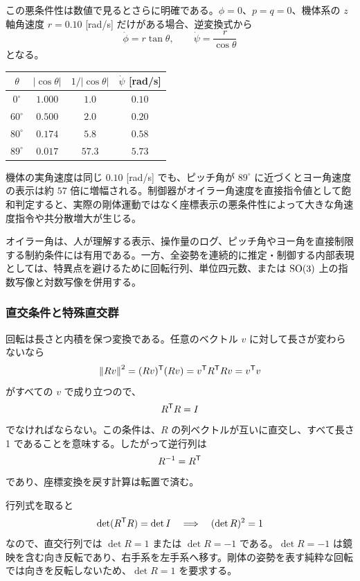 この悪条件性は数値で見るとさらに明確である。$\phi=0$、$p=q=0$、機体系の $z$ 軸角速度 $r=0.10$ [rad/s] だけがある場合、逆変換式から
\begin{equation}
  \dot{\phi}=r\tan\theta,\qquad
  \dot{\psi}=\frac{r}{\cos\theta}
\end{equation}
となる。
\begin{center}
\begin{tabular}{c|c|c|c}
$\theta$ & $|\cos\theta|$ & $1/|\cos\theta|$ & $\dot{\psi}$ [rad/s]\\
\hline
$0^\circ$ & $1.000$ & $1.0$ & $0.10$\\
$60^\circ$ & $0.500$ & $2.0$ & $0.20$\\
$80^\circ$ & $0.174$ & $5.8$ & $0.58$\\
$89^\circ$ & $0.017$ & $57.3$ & $5.73$
\end{tabular}
\end{center}
機体の実角速度は同じ $0.10$ [rad/s] でも、ピッチ角が $89^\circ$ に近づくとヨー角速度の表示は約 $57$ 倍に増幅される。制御器がオイラー角速度を直接指令値として飽和判定すると、実際の剛体運動ではなく座標表示の悪条件性によって大きな角速度指令や共分散増大が生じる。

オイラー角は、人が理解する表示、操作量のログ、ピッチ角やヨー角を直接制限する制約条件には有用である。一方、全姿勢を連続的に推定・制御する内部表現としては、特異点を避けるために回転行列、単位四元数、または $\operatorname{SO}(3)$ 上の指数写像と対数写像を併用する。

\subsubsection{直交条件と特殊直交群}

回転は長さと内積を保つ変換である。任意のベクトル $v$ に対して長さが変わらないなら
\begin{equation}
  \left\|Rv\right\|^2=(Rv)^{\mathsf{T}}(Rv)=v^{\mathsf{T}} R^{\mathsf{T}} R v
  =v^{\mathsf{T}} v
\end{equation}
がすべての $v$ で成り立つので、
\begin{equation}
  R^{\mathsf{T}} R=I
\end{equation}
でなければならない。この条件は、$R$ の列ベクトルが互いに直交し、すべて長さ 1 であることを意味する。したがって逆行列は
\begin{equation}
  R^{-1}=R^{\mathsf{T}}
\end{equation}
であり、座標変換を戻す計算は転置で済む。

行列式を取ると
\begin{equation}
  \det(R^{\mathsf{T}} R)=\det I
  \quad\Longrightarrow\quad
  (\det R)^2=1
\end{equation}
なので、直交行列では $\det R=1$ または $\det R=-1$ である。$\det R=-1$ は鏡映を含む向き反転であり、右手系を左手系へ移す。剛体の姿勢を表す純粋な回転では向きを反転しないため、$\det R=1$ を要求する。


